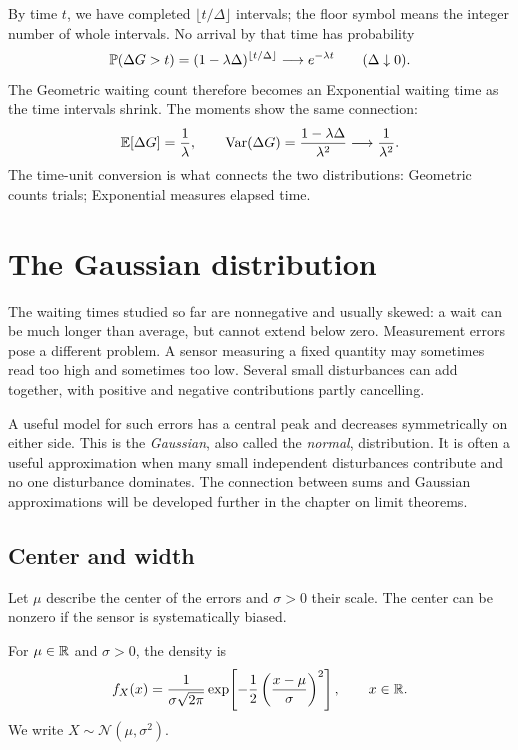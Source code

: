By time \(t\), we have completed \(\lfloor t/\Delta\rfloor\) intervals;
the floor symbol means the integer number of whole intervals.
No arrival by that time has probability
\[
  \mathbb{P}(\Delta G>t)
  =(1-\lambda\Delta)^{\lfloor t/\Delta\rfloor}
  \longrightarrow e^{-\lambda t}
  \qquad(\Delta\downarrow0).
\]
The Geometric waiting count therefore becomes an Exponential waiting
time as the time intervals shrink.
The moments show the same connection:
\[
  \mathbb{E}[\Delta G]=\frac1\lambda,\qquad
  \operatorname{Var}(\Delta G)=\frac{1-\lambda\Delta}{\lambda^2}
  \longrightarrow\frac1{\lambda^2}.
\]
The time-unit conversion is what connects the two distributions:
Geometric counts trials; Exponential measures elapsed time.

\section{The Gaussian distribution}
\label{sec:gaussian}

The waiting times studied so far are nonnegative and usually skewed:
a wait can be much longer than average, but cannot extend below zero.
Measurement errors pose a different problem. A sensor measuring a fixed
quantity may sometimes read too high and sometimes too low. Several
small disturbances can add together, with positive and negative
contributions partly cancelling.

A useful model for such errors has a central peak and decreases
symmetrically on either side. This is the \emph{Gaussian}, also called
the \emph{normal}, distribution. It is often a useful approximation when
many small independent disturbances contribute and no one disturbance
dominates. The connection between sums and Gaussian approximations will
be developed further in the chapter on limit theorems.

\subsection{Center and width}

Let \(\mu\) describe the center of the errors and \(\sigma>0\) their
scale. The center can be nonzero if the sensor is systematically biased.
\begin{definition}
For \(\mu\in\mathbb{R}\) and \(\sigma>0\), the density is
\[
  f_X(x)=\frac1{\sigma\sqrt{2\pi}}
    \exp\!\left[-\frac12\left(\frac{x-\mu}{\sigma}\right)^2\right],
  \qquad x\in\mathbb{R}.
\]
We write \(X\sim\mathcal N(\mu,\sigma^2)\).
\end{definition}

